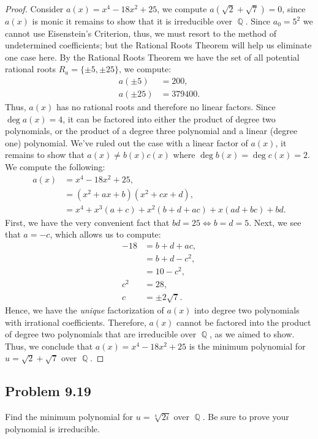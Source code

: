 \documentclass[letterpaper, 12pt]{amsart}
\DeclareMathOperator{\Q}{\mathbb{Q}}
\theoremstyle{definition}  %
\begin{document}
		\begin{proof}
		Consider $a(x) = x^{4} - 18x^{2} + 25$, we compute $a(\sqrt{2} + \sqrt{7}) = 0$, since $a(x)$ is monic it remains to show that it is irreducible over $\Q$.
		Since $a_{0} = 5^{2}$ we cannot use Eisenstein's Criterion, thus, we must resort to the method of undetermined coefficients; but the Rational Roots Theorem will help us eliminate one case here.
		By the Rational Roots Theorem we have the set of all potential rational roots $R_{a} = \{ \pm 5, \pm 25 \}$, we compute:
			\begin{align*}
			a(\pm 5) &= 200, \\
			a(\pm 25) &= 379400.
			\end{align*}
		Thus, $a(x)$ has no rational roots and therefore no linear factors.
		Since $\deg{a(x)} = 4$, it can be factored into either the product of degree two polynomials, or the product of a degree three polynomial and a linear (degree one) polynomial.
		We've ruled out the case with a linear factor of $a(x)$, it remains to show that $a(x) \neq b(x)c(x)$ where $\deg{b(x)} = \deg{c(x)} = 2$.
		We compute the following:
			\begin{align*}
			a(x) &= x^{4} - 18x^{2} + 25, \\
			&= (x^{2} + ax + b)(x^{2} + cx + d), \\
			&= x^{4} + x^{3}(a + c) + x^{2}(b + d + ac) + x(ad + bc) + bd.
			\end{align*}
		First, we have the very convenient fact that $bd = 25 \iff b = d = 5$.
		Next, we see that $a = -c$, which allows us to compute:
			\begin{align*}
			-18 &= b + d + ac, \\
			&= b + d - c^{2}, \\
			&= 10 - c^{2}, \\
			c^{2} &= 28, \\
			c &= \pm2\sqrt{7}.
			\end{align*}
		Hence, we have the \textit{unique} factorization of $a(x)$ into degree two polynomials with irrational coefficients.
		Therefore, $a(x)$ cannot be factored into the product of degree two polynomials that are irreducible over $\Q$, as we aimed to show.
		Thus, we conclude that $a(x) = x^{4} - 18x^{2} + 25$ is the minimum polynomial for $u = \sqrt{2} + \sqrt{7}$ over $\Q$.			
		\end{proof}

	\subsection*{Problem 9.19}
	\label{sub:problem_9_19}
	Find the minimum polynomial for $u = \sqrt[4]{2i}$ over $\Q$.
	Be sure to prove your polynomial is irreducible.
\end{document}
